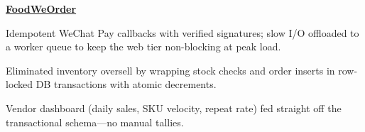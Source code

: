 \begin{twocolentry}{}
\href{https://github.com/faketut/FoodWeOrder}{\textbf{FoodWeOrder}}
\end{twocolentry}
\begin{onecolentry}
\begin{highlights}
\item Idempotent WeChat Pay callbacks with verified signatures; slow I/O offloaded to a worker queue to keep the web tier non-blocking at peak load.
\item Eliminated inventory oversell by wrapping stock checks and order inserts in row-locked DB transactions with atomic decrements.
\item Vendor dashboard (daily sales, SKU velocity, repeat rate) fed straight off the transactional schema---no manual tallies.
\end{highlights}
\end{onecolentry}
